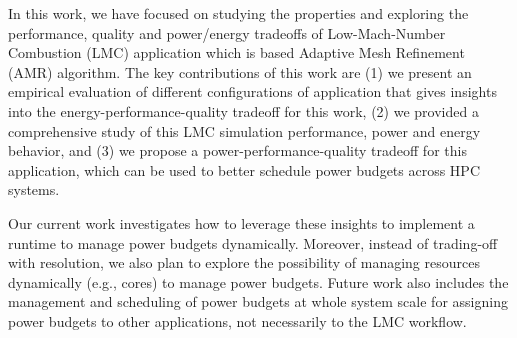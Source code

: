 \label{Section:conclution}

In this work, we  have focused on studying the properties and exploring the performance, quality and power/energy tradeoffs of Low-Mach-Number Combustion (LMC) application which is based Adaptive Mesh Refinement (AMR) algorithm. The key contributions of this work are (1) we present an empirical evaluation of different configurations of application that gives insights into the energy-performance-quality tradeoff for this work, (2) we provided a comprehensive study of this LMC simulation performance, power and energy behavior, and (3) we propose a power-performance-quality tradeoff for this application, which can be used to better schedule power budgets across HPC systems.

Our current work investigates how to leverage these insights to implement a runtime to manage power budgets dynamically. Moreover, instead of trading-off with resolution, we also plan to explore the possibility of managing resources dynamically (e.g., cores) to manage power budgets. Future work also includes the management and scheduling of power budgets at whole system scale for assigning power budgets to other applications, not necessarily to the LMC workflow.